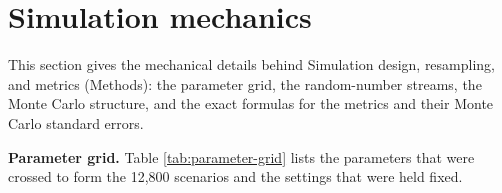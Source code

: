 \documentclass[11pt]{article}
\makeatletter
\newcommand{\applabel}[2]{\def\@currentlabel{#1}\label{#2}}
\makeatother
\begin{document}
\begin{table}[!htb]
\begin{tabular}{lcccc}
\bottomrule

\end{tabular}

\end{table}

\section{Simulation mechanics}\label{s2.-simulation-mechanics}

\applabel{S5}{app:mechanics}This section gives the mechanical details
behind Simulation design, resampling, and metrics (Methods): the
parameter grid, the random-number streams, the Monte Carlo structure,
and the exact formulas for the metrics and their Monte Carlo standard
errors.

\textbf{Parameter grid.} Table \ref{tab:parameter-grid} lists the
parameters that were crossed to form the 12,800 scenarios and the
settings that were held fixed.
\end{document}
